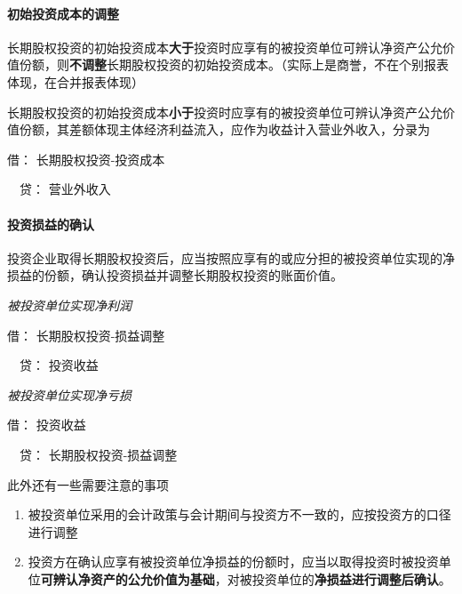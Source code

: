 \documentclass[UTF8,12pt]{ctexart}
\newenvironment{Dr}{\noindent 借：}{\par}
\newenvironment{Cr}{\noindent \ \ 贷：}{\par}
\numberwithin{equation}{section} %
\numberwithin{figure}{section}
\numberwithin{table}{section}
\begin{document}
	
	
	
	\paragraph{初始投资成本的调整}
	长期股权投资的初始投资成本\textbf{大于}投资时应享有的被投资单位可辨认净资产公允价值份额，则\textbf{不调整}长期股权投资的初始投资成本。（实际上是商誉，不在个别报表体现，在合并报表体现）
	
	长期股权投资的初始投资成本\textbf{小于}投资时应享有的被投资单位可辨认净资产公允价值份额，其差额体现主体经济利益流入，应作为收益计入营业外收入，分录为
	
	\begin{Dr}
		长期股权投资-投资成本
	\end{Dr}
	\begin{Cr}
		营业外收入
	\end{Cr}
	
	
	
	\paragraph{投资损益的确认}
	投资企业取得长期股权投资后，应当按照应享有的或应分担的被投资单位实现的净损益的份额，确认投资损益并调整长期股权投资的账面价值。
	
	\textit{被投资单位实现净利润}
	
	\begin{Dr}
		长期股权投资-损益调整
	\end{Dr}
	\begin{Cr}
		投资收益
	\end{Cr}
	
	\textit{被投资单位实现净亏损}
	
	\begin{Dr}
		投资收益
	\end{Dr}
	\begin{Cr}
		长期股权投资-损益调整
	\end{Cr}
	
	此外还有一些需要注意的事项
	\begin{enumerate}
		\item 被投资单位采用的会计政策与会计期间与投资方不一致的，应按投资方的口径进行调整
		
		\item 投资方在确认应享有被投资单位净损益的份额时，应当以取得投资时被投资单位\textbf{可辨认净资产的公允价值为基础}，对被投资单位的\textbf{净损益进行调整后确认}。
	\end{enumerate}
	
\end{document}
